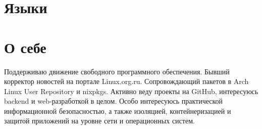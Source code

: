 \section{Языки}

\section{О себе}

Поддерживаю движение свободного программного обеспечения. Бывший корректор новостей на
портале Linux.org.ru. Сопровождающий пакетов в Arch Linux User Repository и nixpkgs.
Активно веду проекты на GitHub, интересуюсь backend и web-разработкой в целом. Особо
интересуюсь практической информационной безопасностью, а также изоляцией, контейнеризацией
и защитой приложений на уровне сети и операционных систем.
